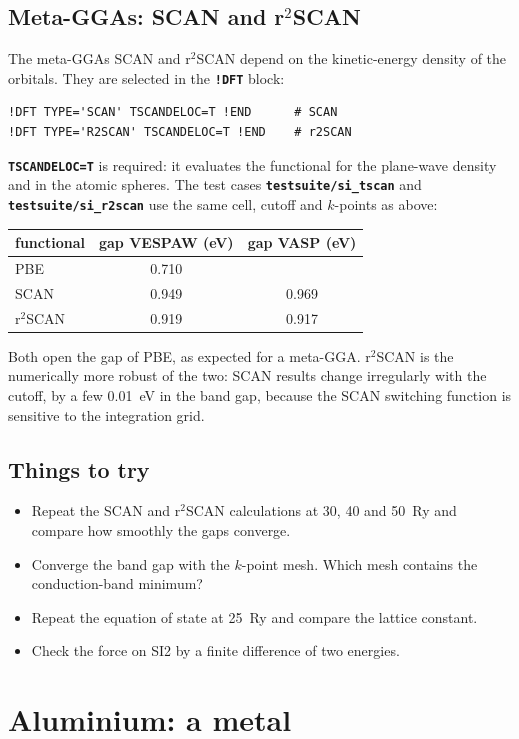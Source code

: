 \documentclass[11pt,a4paper,oneside]{book}
\newcommand{\key}[1]{\textbf{\texttt{#1}}}
\newcommand{\file}[1]{\textbf{\texttt{#1}}}
\begin{document}
\section{Meta-GGAs: SCAN and r$^2$SCAN}

The meta-GGAs SCAN and r$^2$SCAN depend on the kinetic-energy density of
the orbitals. They are selected in the \key{!DFT} block:
\begin{verbatim}
!DFT TYPE='SCAN' TSCANDELOC=T !END      # SCAN
!DFT TYPE='R2SCAN' TSCANDELOC=T !END    # r2SCAN
\end{verbatim}
\key{TSCANDELOC=T} is required: it evaluates the functional for the
plane-wave density and in the atomic spheres. The test cases
\file{testsuite/si\_tscan} and \file{testsuite/si\_r2scan} use the same
cell, cutoff and $k$-points as above:
\begin{center}
\begin{tabular}{lcc}\toprule
functional & gap VESPAW (eV) & gap VASP (eV) \\ \midrule
PBE & 0.710 & \\
SCAN & 0.949 & 0.969 \\
r$^2$SCAN & 0.919 & 0.917 \\ \bottomrule
\end{tabular}
\end{center}
Both open the gap of PBE, as expected for a meta-GGA. r$^2$SCAN is the
numerically more robust of the two: SCAN results change irregularly
with the cutoff, by a few 0.01~eV in the band gap, because the SCAN
switching function is sensitive to the integration grid.

\section{Things to try}
\begin{itemize}
\item Repeat the SCAN and r$^2$SCAN calculations at 30, 40 and 50~Ry
  and compare how smoothly the gaps converge.
\item Converge the band gap with the $k$-point mesh. Which mesh
  contains the conduction-band minimum?
\item Repeat the equation of state at 25~Ry and compare the lattice
  constant.
\item Check the force on SI2 by a finite difference of two energies.
\end{itemize}

\chapter{Aluminium: a metal}
\minitoc
\end{document}
